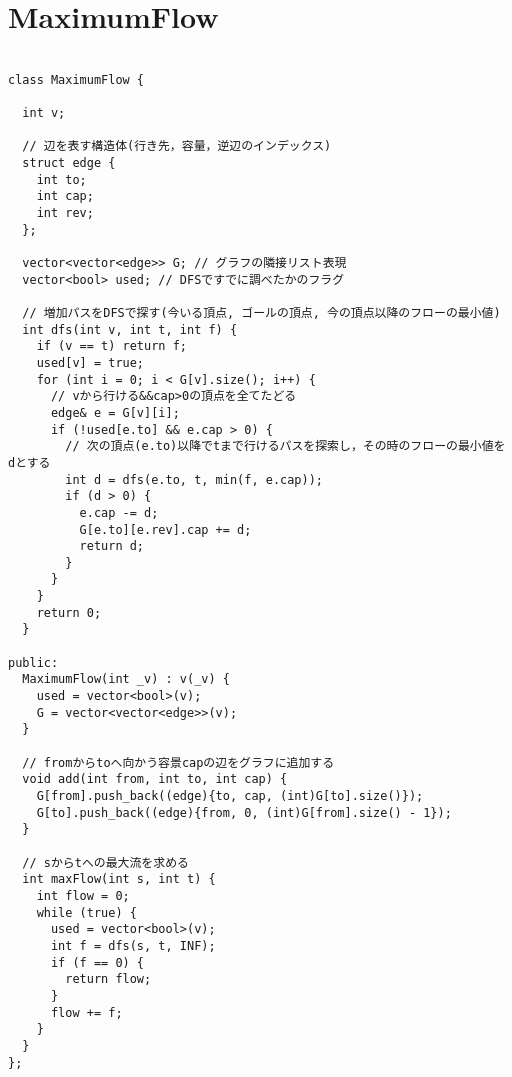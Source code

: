 \documentclass{jsarticle}
\begin{document}
\section{MaximumFlow}
\color{black}
\begin{lstlisting}[caption=MaximumFlow]

class MaximumFlow {

  int v;

  // 辺を表す構造体(行き先，容量，逆辺のインデックス)
  struct edge {
    int to;
    int cap;
    int rev;
  };

  vector<vector<edge>> G; // グラフの隣接リスト表現
  vector<bool> used; // DFSですでに調べたかのフラグ

  // 増加パスをDFSで探す(今いる頂点, ゴールの頂点, 今の頂点以降のフローの最小値)
  int dfs(int v, int t, int f) {
    if (v == t) return f;
    used[v] = true;
    for (int i = 0; i < G[v].size(); i++) {
      // vから行ける&&cap>0の頂点を全てたどる
      edge& e = G[v][i];
      if (!used[e.to] && e.cap > 0) {
        // 次の頂点(e.to)以降でtまで行けるパスを探索し，その時のフローの最小値をdとする
        int d = dfs(e.to, t, min(f, e.cap));
        if (d > 0) {
          e.cap -= d;
          G[e.to][e.rev].cap += d;
          return d;
        }
      }
    }
    return 0;
  }

public:
  MaximumFlow(int _v) : v(_v) {
    used = vector<bool>(v);
    G = vector<vector<edge>>(v);
  }

  // fromからtoへ向かう容景capの辺をグラフに追加する
  void add(int from, int to, int cap) {
    G[from].push_back((edge){to, cap, (int)G[to].size()});
    G[to].push_back((edge){from, 0, (int)G[from].size() - 1});
  }

  // sからtへの最大流を求める
  int maxFlow(int s, int t) {
    int flow = 0;
    while (true) {
      used = vector<bool>(v);
      int f = dfs(s, t, INF);
      if (f == 0) {
        return flow;
      }
      flow += f;
    }
  }
};

\end{lstlisting}

\color{white}
\end{document}
